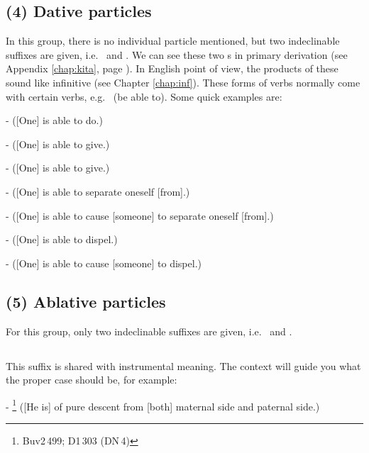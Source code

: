 \subsection*{(4) Dative particles}\label{nip:tudm}\label{nip:tave}

In this group, there is no individual particle mentioned, but two indeclinable suffixes are given, i.e.\  and . We can see these two s in primary derivation (see Appendix \ref{chap:kita}, page \pageref{par:kitatum}). In English point of view, the products of these sound like infinitive (see Chapter \ref{chap:inf}). These forms of verbs normally come with certain verbs, e.g.\  (be able to). Some quick examples are:\par
-  ([One] is able to do.) \par
-  ([One] is able to give.) \par
-  ([One] is able to give.) \par
-  ([One] is able to separate oneself [from].) \par
-  ([One] is able to cause [someone] to separate oneself [from].) \par
-  ([One] is able to dispel.) \par
-  ([One] is able to cause [someone] to dispel.) \par

\subsection*{(5) Ablative particles}

For this group, only two indeclinable suffixes are given, i.e.\  and .

\subsection*{}\label{nip:to2}
This suffix is shared with instrumental meaning. The context will guide you what the proper case should be, for example:\par
- \footnote{Buv2\,499; D1\,303 (DN\,4)} ([He is] of pure descent from [both] maternal side and paternal side.) \par

